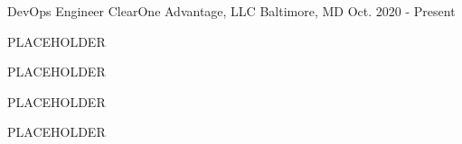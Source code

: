 

\begin{cventries}

  \cventry
    {DevOps Engineer} %
    {ClearOne Advantage, LLC} %
    {Baltimore, MD} %
    {Oct. 2020 - Present} %
    {
      \begin{cvitems} %
        \item{PLACEHOLDER}
        \item {PLACEHOLDER}
        \item {PLACEHOLDER}
        \item {PLACEHOLDER}
      \end{cvitems}
    }


\end{cventries}
